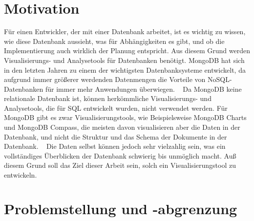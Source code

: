 \iffalse
Die Einleitung dient dazu, beim Leser Interesse für die Inhalte 
Praxissemesterberichts zu wecken, die behandelten Probleme aufzuzeigen 
und die zu ihrer Lösung entwickelten Konzepte zu beschreiben.
\fi

\section{Motivation}
\label{sec:motivation}

\iffalse
In der Motivation wird dargestellt, welche Bedeutung die im 
Praxissemester zu entwickelnden Lösungen für das betreuende Unternehmen 
haben. Es wird beispielsweise aufzeigt, in welches Produkt sie eingehen, 
welcher Ablauf verbessert werden soll etc.
\fi

Für einen Entwickler, der mit einer Datenbank arbeitet, ist es wichtig zu wissen, wie diese Datenbank aussieht, was für Abhängigkeiten es gibt, und ob die Implementierung auch wirklich der Planung entspricht.
Aus diesem Grund werden Visualisierungs- und Analysetools für Datenbanken benötigt.
MongoDB hat sich in den letzten Jahren zu einem der wichtigsten Datenbanksysteme entwickelt, da aufgrund immer größerer werdenden Datenmengen die Vorteile von NoSQL-Datenbanken für immer mehr Anwendungen überwiegen.
~\autocite{db-engines:mongodb}
Da MongoDB keine relationale Datenbank ist, können herkömmliche Visualisierungs- und Analysetools, die für SQL entwickelt wurden, nicht verwendet werden.
Für MongoDB gibt es zwar Visualisierungstools, wie Beispielsweise MongoDB Charts und MongoDB Compass, die meisten davon visualisieren aber die Daten in der Datenbank, und nicht die Struktur und das Schema der Dokumente in der Datenbank.
~\autocite{knowi:mongo_vis_tools}
Die Daten selbst können jedoch sehr vielzahlig sein, was ein vollständiges Überblicken der Datenbank schwierig bis unmöglich macht.
Auß diesem Grund soll das Ziel dieser Arbeit sein, solch ein Visualisierungstool zu entwickeln.

\section{Problemstellung und -abgrenzung}
\label{sec:problemstellung}

\iffalse
Die Problemstellung dient dazu, das zu lösende Problem klar zu 
definieren und abzugrenzen. Der Praktikant soll ein klares Verständnis 
des zu lösenden Problems haben. Insbesondere soll auch verhindert 
werden, dass zu viele Probleme gleichzeitig angegangen werden. Eine 
Negativabgrenzung verhindert, dass beim Leser später nicht erfüllte 
Erwartungen geweckt werden.
\fi

